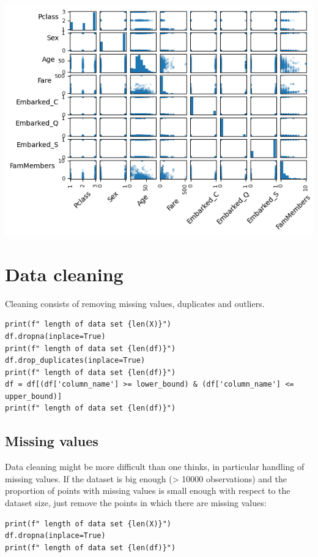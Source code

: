 \documentclass[24pt]{article}
\begin{document}
\begin{center}
\includegraphics[scale = 0.5]{scatter_matrix_2.png}
\end{center}

\section{Data cleaning}
Cleaning consists of removing missing values, duplicates and outliers. 

\begin{lstlisting}
print(f" length of data set {len(X)}")
df.dropna(inplace=True)
print(f" length of data set {len(df)}")
df.drop_duplicates(inplace=True)
print(f" length of data set {len(df)}")
df = df[(df['column_name'] >= lower_bound) & (df['column_name'] <= upper_bound)]  
print(f" length of data set {len(df)}")
\end{lstlisting}

\subsection{Missing values}
Data cleaning might be more difficult than one thinks, in particular handling of missing values.   If the dataset is big enough (> 10000 observations) and the proportion of points with missing values is small enough with respect to the dataset size, just remove the points in which there are missing values:

\begin{lstlisting}
print(f" length of data set {len(X)}")
df.dropna(inplace=True)
print(f" length of data set {len(df)}")
\end{lstlisting}
\end{document}
